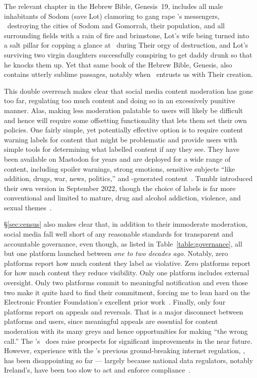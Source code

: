 The relevant chapter in the Hebrew Bible, Genesis~19, includes all male
inhabitants of Sodom (save Lot) clamoring to gang rape \YHWH's messengers,
\YHWH\ destroying the cities of Sodom and Gomorrah, their population, and all
surrounding fields with a rain of fire and brimstone, Lot's wife being turned
into a salt pillar for copping a glance at \YHWH\ during Their orgy of
destruction, and Lot's surviving two virgin daughters successfully conspiring to
get daddy drunk so that he knocks them up. Yet that same book of the Hebrew
Bible, Genesis, also contains utterly sublime passages, notably when \YHWH\
entrusts us with Their creation.

This double overreach makes clear that social media content moderation has gone
too far, regulating too much content and doing so in an excessively punitive
manner. Alas, making less moderation palatable to users will likely be difficult
and hence will require some offsetting functionality that lets them set their
own policies. One fairly simple, yet potentially effective option is to require
content warning labels for content that might be problematic and provide users
with simple tools for determining what labelled content if any they see. They
have been available on Mastodon for years and are deployed for a wide range of
content, including spoiler warnings, strong emotions, sensitive subjects ``like
addition, drugs, war, news, politics,'' and \AI-generated
content~\cite{Maloki2022,Sheehan2022}. Tumblr introduced their own version in
September 2022, though the choice of labels is far more conventional and limited
to mature, drug and alcohol addiction, violence, and sexual
themes~\cite{Tumblr2022}.

\S\ref{sec:census} also makes clear that, in addition to their immoderate
moderation, social media fall well short of any reasonable standards for
transparent and accountable governance, even though, as listed in
Table~\ref{table:governance}, all but one platform launched between \emph{one to
two decades ago}. Notably, zero platforms report how much content they label as
violative. Zero platforms report for how much content they reduce visibility.
Only one platform includes external oversight. Only two platforms commit to
meaningful notification and even those two make it quite hard to find their
commitment, forcing me to lean hard on the Electronic Frontier Foundation's
excellent prior work~\cite{CrockerGebhartea2019}. Finally, only four platforms
report on appeals and reversals. That is a major disconnect between platforms
and users, since meaningful appeals are essential for content moderation with
its many greys and hence opportunities for making ``the wrong call.'' The \EU's
\DSA\ does raise prospects for significant improvements in the near future.
However, experience with the \EU's previous ground-breaking internet regulation,
\GDPR, has been disappointing so far --- largely because national data
regulators, notably Ireland's, have been too slow to act and enforce
compliance~\cite{Burgess2022}.

